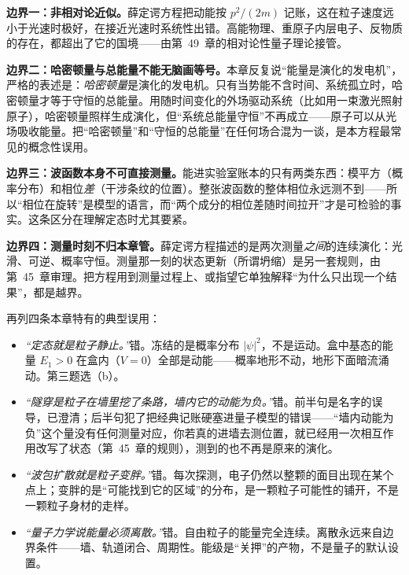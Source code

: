 \begin{mainline}
\textbf{边界一：非相对论近似。}薛定谔方程把动能按 \(p^{2}/(2m)\) 记账，这在粒子速度远小于光速时极好，在接近光速时系统性出错。高能物理、重原子内层电子、反物质的存在，都超出了它的国境——由第~49~章的相对论性量子理论接管。

\textbf{边界二：哈密顿量与总能量不能无脑画等号。}本章反复说“能量是演化的发电机”，严格的表述是：\emph{哈密顿量}是演化的发电机。只有当势能不含时间、系统孤立时，哈密顿量才等于守恒的总能量。用随时间变化的外场驱动系统（比如用一束激光照射原子），哈密顿量照样生成演化，但“系统总能量守恒”不再成立——原子可以从光场吸收能量。把“哈密顿量”和“守恒的总能量”在任何场合混为一谈，是本方程最常见的概念性误用。

\textbf{边界三：波函数本身不可直接测量。}能进实验室账本的只有两类东西：模平方（概率分布）和相位\emph{差}（干涉条纹的位置）。整张波函数的整体相位永远测不到——所以“相位在旋转”是模型的语言，而“两个成分的相位差随时间拉开”才是可检验的事实。这条区分在理解定态时尤其要紧。

\textbf{边界四：测量时刻不归本章管。}薛定谔方程描述的是两次测量\emph{之间}的连续演化：光滑、可逆、概率守恒。测量那一刻的状态更新（所谓坍缩）是另一套规则，由第~45~章审理。把方程用到测量过程上、或指望它单独解释“为什么只出现一个结果”，都是越界。

再列四条本章特有的典型误用：

\begin{itemize}[leftmargin=1.8em]
  \item \emph{“定态就是粒子静止。”}错。冻结的是概率分布 \(|\psi|^{2}\)，不是运动。盒中基态的能量 \(E_{1}>0\) 在盒内（\(V=0\)）全部是动能——概率地形不动，地形下面暗流涌动。第三题选（b）。
  \item \emph{“隧穿是粒子在墙里挖了条路，墙内它的动能为负。”}错。前半句是名字的误导，已澄清；后半句犯了把经典记账硬塞进量子模型的错误——“墙内动能为负”这个量没有任何测量对应，你若真的进墙去测位置，就已经用一次相互作用改写了状态（第~45~章的规则），测到的也不再是原来的演化。
  \item \emph{“波包扩散就是粒子变胖。”}错。每次探测，电子仍然以整颗的面目出现在某个点上；变胖的是“可能找到它的区域”的分布，是一颗粒子可能性的铺开，不是一颗粒子身材的走样。
  \item \emph{“量子力学说能量必须离散。”}错。自由粒子的能量完全连续。离散永远来自边界条件——墙、轨道闭合、周期性。能级是“关押”的产物，不是量子的默认设置。
\end{itemize}
\end{mainline}


